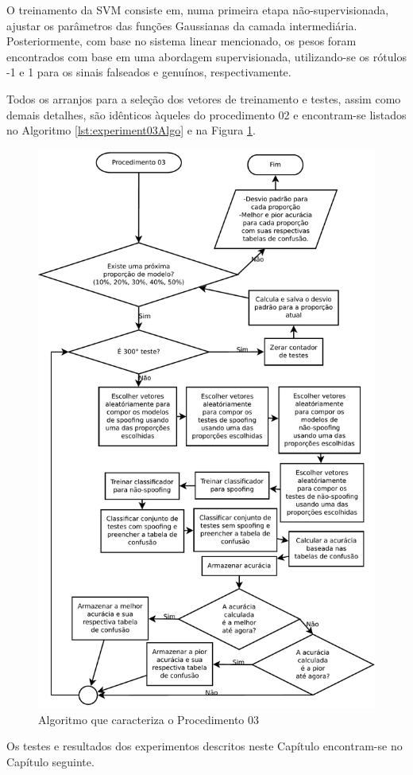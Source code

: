 		\par O treinamento da SVM consiste em, numa primeira etapa não-supervisionada, ajustar os parâmetros das funções Gaussianas da camada intermediária. Posteriormente, com base no sistema linear mencionado, os pesos foram encontrados com base em uma abordagem supervisionada, utilizando-se os rótulos -1 e 1 para os sinais falseados e genuínos, respectivamente.    
		
		\par Todos os arranjos para a seleção dos vetores de treinamento e testes, assim como demais detalhes,   são idênticos àqueles do procedimento 02 e encontram-se listados no Algoritmo \ref{lst:experiment03Algo} e na Figura \ref{fig:experiment03Algo}. 
		
		
		
		\begin{figure}[h]
			\centering
			\includegraphics[width=0.9\linewidth]{images/AlgoProcedure03}
			\caption{Algoritmo que caracteriza o Procedimento 03}
			\label{fig:experiment03Algo}
		\end{figure}

        \par Os testes e resultados dos experimentos descritos neste Capítulo encontram-se no Capítulo seguinte.
